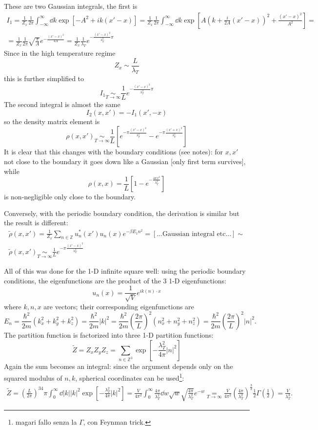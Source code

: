 These are two Gaussian integrals, the first is
\begin{gather*}
    I_1 = \frac{1}{Z_x}\frac{1}{2\pi}\int_{-\infty}^{\infty} \dd k
    \exp\left[ -A^2+ik(x'-x) \right]= \frac{1}{Z_x}\frac{1}{2\pi}
    \int_{-\infty}^{\infty} \dd k \exp\left[ A\left(k+\frac{i}{2A}(x'-x)\right)^2
    +\frac{(x'-x)^2}{A^2}\right] =\\
    =\frac{1}{Z_x}\frac{1}{2\pi}\sqrt{\frac{\pi}{A}}e^{-\frac{(x'-x)^2}{4A}}=
    \frac{1}{Z_x} \frac{1}{\lambda_T} e^{-\frac{(x'-x)^2}{\lambda_T^2}\pi}
\end{gather*}
Since in the high temperature regime
\[
    Z_x\sim \frac{L}{\lambda_T}
\]
this is further simplified to
\[
    I_1\underset{T\to\infty}\sim\frac{1}{L}e^{-\frac{(x'-x)^2}{\lambda_T^2}\pi}
\]
The second integral is almost the same
\[
    I_2(x,x')=-I_1(x',-x)
\]
so the density matrix element is
\[
    \rho(x,x') \underset{T\to\infty}\sim\frac{1}{L}\left[
    e^{-\pi\frac{(x'-x)^2}{\lambda_T^2}}-e^{-\pi\frac{(x'+x)^2}{\lambda_T^2}}
\right]
\]
It is clear that this changes with the boundary conditions (see notes):
for $x,x'$ not close to the boundary it goes down like a Gaussian [only first
term survives], while
\[
    \rho(x,x) = \frac{1}{L}\left[1-e^{-\frac{4\pi x^2}{\lambda_T^2}}\right]
\]
is non-negligible only close to the boundary.

Conversely, with the periodic boundary condition, the derivation is similar
but the result is different:
\begin{gather*}
    \tilde\rho(x,x') = \frac{1}{Z_x}\sum_{n\in\mathbb{Z}}^{}u_n^*(x')u_n(x)e^{
    -\beta E_1 n^2} = [\text{...Gaussian integral etc...}]\sim\\
    \tilde\rho(x,x')\underset{T\to\infty}\sim \frac{1}{L}e^{-\pi\frac{(x'-x)^2}
    {\lambda_T^2}}
\end{gather*}

All of this was done for the 1-D infinite square well: using the periodic boundary
conditions, the eigenfunctions are the product of the $3$ 1-D eigenfunctions:
\[
    u_n(x) = \frac{1}{\sqrt{V}}e^{ik(n)\cdot x}
\]
where $k,n,x$ are vectors; their corresponding eigenfunctions are
\[
    E_n = \frac{\hbar^2}{2m}(k_x^2+k_y^2+k_z^2)=\frac{\hbar^2}{2m}|k|^2=
    \frac{\hbar^2}{2m}
    \left(\frac{2\pi}{L}\right)^2(n_x^2+n_y^2+n_z^2)= \frac{\hbar^2}{2m}\left(
    \frac{2\pi}{L}\right)^2|n|^2.
\]
The partition function is factorized into three 1-D partition functions:
\[
    \tilde Z = Z_xZ_yZ_z = \sum_{n\in\mathbb{Z}^3}^{} \exp\left[
    -\frac{\lambda_T^2}{4\pi}|n|^2 \right]
\]
Again the sum becomes an integral: since the argument depends only on the
squared modulus of $n,k$, spherical coordinates can be used\footnote{
magari fallo senza la $\Gamma$, con Feynman trick.}:
\begin{gather*}
    \tilde Z = \left(\frac{L}{2\pi}\right)^34\pi\int_0^\infty\dd |k| |k|^2
    \exp\left[ -\frac{\lambda_T^2}{4\pi} |k|^2 \right] =
    \frac{V}{4\pi^2}\int_{0}^{\infty} \frac{4\pi}{\lambda_T^2} \dd w \sqrt{w}
    \sqrt{\frac{4\pi}{\lambda_T^2}}e^{-w}
    \underset{T\to\infty} = \frac{V}{4\pi^2}\left(\frac{4\pi}{\lambda_T^2}\right)
    ^{\frac{3}{2}}\frac{1}{2}\Gamma\left(\frac{1}{2}\right)= \frac{V}{
    \lambda_T^3}.
\end{gather*}

